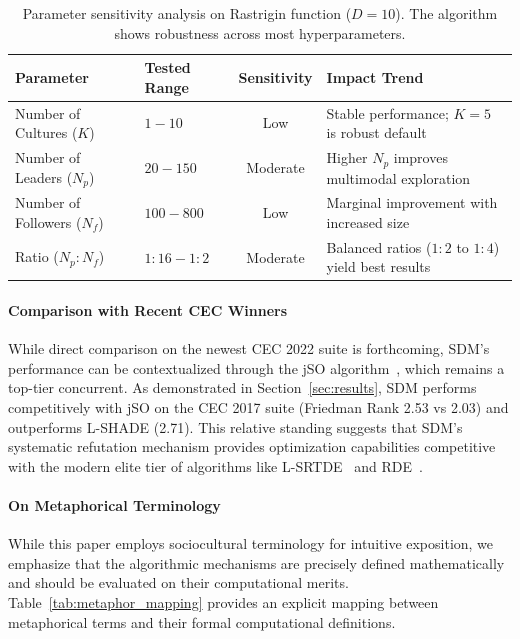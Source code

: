 \documentclass[11pt]{article}
\begin{document}
\begin{table}[ht]
\centering
\caption{Parameter sensitivity analysis on Rastrigin function ($D=10$). The algorithm shows robustness across most hyperparameters.}
\label{tab:sensitivity}
\small
\begin{tabular}{@{}llcl@{}}
\toprule
Parameter & Tested Range & Sensitivity & Impact Trend \\
\midrule
Number of Cultures ($K$) & $1 - 10$ & Low & Stable performance; $K=5$ is robust default \\
Number of Leaders ($N_p$) & $20 - 150$ & Moderate & Higher $N_p$ improves multimodal exploration \\
Number of Followers ($N_f$) & $100 - 800$ & Low & Marginal improvement with increased size \\
Ratio ($N_p:N_f$) & $1:16 - 1:2$ & Moderate & Balanced ratios ($1:2$ to $1:4$) yield best results \\
\bottomrule
\end{tabular}
\end{table}

\paragraph{Comparison with Recent CEC Winners} While direct comparison on the newest CEC 2022 suite is forthcoming, SDM's performance can be contextualized through the jSO algorithm~\cite{brest2017jso}, which remains a top-tier concurrent. As demonstrated in Section~\ref{sec:results}, SDM performs competitively with jSO on the CEC 2017 suite (Friedman Rank 2.53 vs 2.03) and outperforms L-SHADE (2.71). This relative standing suggests that SDM's systematic refutation mechanism provides optimization capabilities competitive with the modern elite tier of algorithms like L-SRTDE~\cite{stanovov2024lsrtde} and RDE~\cite{tao2024rde}.

\paragraph{On Metaphorical Terminology} While this paper employs sociocultural terminology for intuitive exposition, we emphasize that the algorithmic mechanisms are precisely defined mathematically and should be evaluated on their computational merits. Table~\ref{tab:metaphor_mapping} provides an explicit mapping between metaphorical terms and their formal computational definitions.
\end{document}
